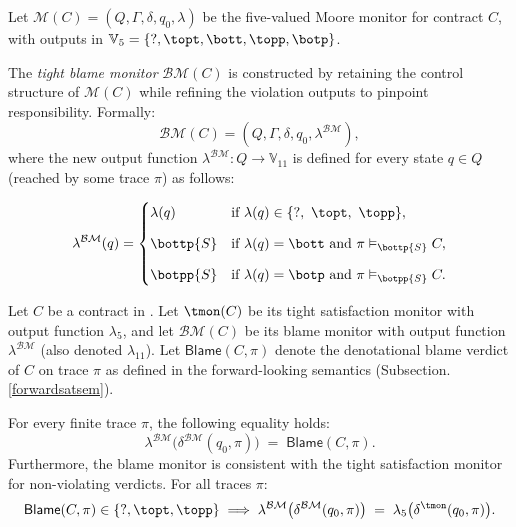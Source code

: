 \begin{definition}
  \label{def:bm-refinement}
  Let $\mathcal{M}(C)=(Q,\Gamma,\delta,q_0,\lambda)$ be the five-valued Moore monitor for contract $C$, with outputs in $\mathbb{V}_5 = \{\mathsf{?},\topt,\bott,\topp,\botp\}$.
  
  The \emph{tight blame monitor} $\mathcal{BM}(C)$ is constructed by retaining the control structure of $\mathcal{M}(C)$ while refining the violation outputs to pinpoint responsibility. Formally:
  \[
  \mathcal{BM}(C) = (Q,\Gamma,\delta,q_0,\lambda^{\mathcal{BM}}),
  \]
  where the new output function $\lambda^{\mathcal{BM}}: Q \to \mathbb{V}_{11}$ is defined for every state $q \in Q$ (reached by some trace $\pi$) as follows:
  
  \[
  \lambda^{\mathcal{BM}}(q) = 
  \begin{cases}
    \lambda(q) & \text{if } \lambda(q) \in \{\mathsf{?},\ \topt,\ \topp\}, \\[8pt]
    
    \bottp{S} & \text{if } \lambda(q) = \bott \text{ and } \pi \vDash_{\bottp{S}} C, \\[8pt]
    
    \botpp{S} & \text{if } \lambda(q) = \botp \text{ and } \pi \vDash_{\botpp{S}} C.
  \end{cases}
  \]

  \begin{theorem}
    \label{thm:bm-correct}
    Let $C$ be a contract in \cDL. Let $\tmon(C)$ be its tight satisfaction monitor with output function $\lambda_5$, and let $\mathcal{BM}(C)$ be its blame monitor with output function $\lambda^{\mathcal{BM}}$ (also denoted $\lambda_{11}$).
    Let $\mathsf{Blame}(C,\pi)$ denote the denotational blame verdict of $C$ on trace $\pi$ as defined in the forward-looking semantics (Subsection.{\ref{forwardsatsem}}).
    
    For every finite trace $\pi$, the following equality holds:
    \[
    \lambda^{\mathcal{BM}}\bigl(\delta^{\mathcal{BM}}(q_0,\pi)\bigr) 
      \;=\; 
    \mathsf{Blame}(C,\pi).
    \]
    Furthermore, the blame monitor is consistent with the tight satisfaction monitor for non-violating verdicts. For all traces $\pi$:
    \[
    \mathsf{Blame}(C,\pi)\in \{\mathsf{?}, \topt, \topp\} 
      \implies 
    \lambda^{\mathcal{BM}}\bigl(\delta^{\mathcal{BM}}(q_0,\pi)\bigr) 
      \;=\; 
    \lambda_5\bigl(\delta^{\tmon}(q_0,\pi)\bigr).
    \]
    \end{theorem}
    

\end{definition}
